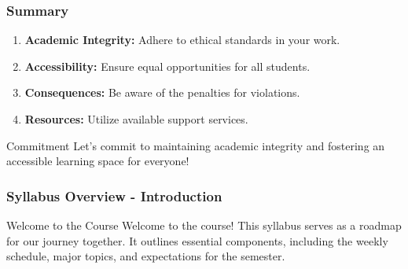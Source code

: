 \documentclass[aspectratio=169]{beamer}
\begin{document}
\begin{frame}[fragile]
    \frametitle{Summary}
    \begin{enumerate}
        \item \textbf{Academic Integrity:} Adhere to ethical standards in your work.
        \item \textbf{Accessibility:} Ensure equal opportunities for all students.
        \item \textbf{Consequences:} Be aware of the penalties for violations.
        \item \textbf{Resources:} Utilize available support services.
    \end{enumerate}
    \begin{block}{Commitment}
        Let's commit to maintaining academic integrity and fostering an accessible learning space for everyone!
    \end{block}
\end{frame}

\begin{frame}[fragile]
    \frametitle{Syllabus Overview - Introduction}
    \begin{block}{Welcome to the Course}
       Welcome to the course! This syllabus serves as a roadmap for our journey together. It outlines essential components, including the weekly schedule, major topics, and expectations for the semester.
    \end{block}
\end{frame}
\end{document}

